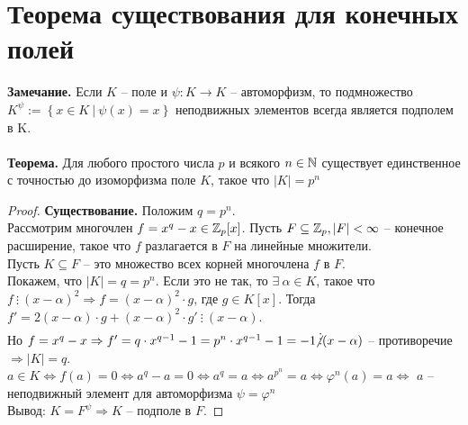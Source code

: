 \section{Теорема существования для конечных полей}

\textbf{Замечание.} Если $K$ -- поле и $\psi: K\to K$ -- автоморфизм, то подмножество $K^{\psi}:=\left\{ x\in K\ |\ \psi(x)=x \right\}$ неподвижных элементов всегда является подполем в K.\\\\
\textbf{Теорема.} Для любого простого числа $p$ и всякого $n\in \mathbb{N}$ существует единственное с точностью до изоморфизма поле $K$, такое что $|K|=p^n$
\begin{proof}
    \textbf{Существование.} Положим $q=p^n$.\\
    Рассмотрим многочлен $f=x^q-x\in \mathbb{Z}_p[x]$. Пусть $F\subseteq \mathbb{Z}_p, |F|<\infty$ -- конечное расширение, такое что $f$ разлагается в $F$ на линейные множители.\\
    Пусть $K\subseteq F$ -- это множество всех корней многочлена $f$ в $F$.\\
    Покажем, что $|K|=q=p^n$. Если это не так, то $\exists \ \alpha\in K$, такое что $f\ \vdots \ (x-\alpha)^2\Rightarrow f=(x-\alpha)^2\cdot g$, где $g\in K[x]$. Тогда $f'=2(x-\alpha)\cdot g+(x-\alpha)^2\cdot g'\ \vdots \ (x-\alpha)$.\\
    Но $f=x^q-x\Rightarrow f'=q\cdot x^{q-1}-1=p^n\cdot x^{q-1}-1=-1 \!\!\not\vdots (x-\alpha)$ -- противоречие $\Rightarrow |K|=q$.\\
    $a\in K\Leftrightarrow f(a)=0\Leftrightarrow a^q-a=0\Leftrightarrow a^q=a\Leftrightarrow a^{p^n}=a\Leftrightarrow \varphi^n(a)=a\Leftrightarrow $ $a$ -- неподвижный элемент для автоморфизма $\psi=\varphi^n$\\
    Вывод: $K=F^{\psi}\Rightarrow K$ -- подполе в $F$.
\end{proof}